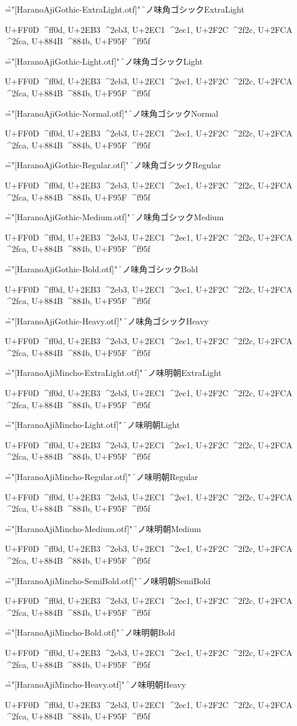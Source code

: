 
\nopagenumbers

\def\test{%
U+FF0D ^^^^ff0d,
U+2EB3 ^^^^2eb3,
U+2EC1 ^^^^2ec1,
U+2F2C ^^^^2f2c,
U+2FCA ^^^^2fca,
U+884B ^^^^884b,
U+F95F ^^^^f95f
}

\font\f="[HaranoAjiGothic-ExtraLight.otf]" \f
原ノ味角ゴシックExtraLight\par
\test

\font\f="[HaranoAjiGothic-Light.otf]" \f
原ノ味角ゴシックLight\par
\test

\font\f="[HaranoAjiGothic-Normal.otf]" \f
原ノ味角ゴシックNormal\par
\test

\font\f="[HaranoAjiGothic-Regular.otf]" \f
原ノ味角ゴシックRegular\par
\test

\font\f="[HaranoAjiGothic-Medium.otf]" \f
原ノ味角ゴシックMedium\par
\test

\font\f="[HaranoAjiGothic-Bold.otf]" \f
原ノ味角ゴシックBold\par
\test

\font\f="[HaranoAjiGothic-Heavy.otf]" \f
原ノ味角ゴシックHeavy\par
\test

\font\f="[HaranoAjiMincho-ExtraLight.otf]" \f
原ノ味明朝ExtraLight\par
\test

\font\f="[HaranoAjiMincho-Light.otf]" \f
原ノ味明朝Light\par
\test

\font\f="[HaranoAjiMincho-Regular.otf]" \f
原ノ味明朝Regular\par
\test

\font\f="[HaranoAjiMincho-Medium.otf]" \f
原ノ味明朝Medium\par
\test

\font\f="[HaranoAjiMincho-SemiBold.otf]" \f
原ノ味明朝SemiBold\par
\test

\font\f="[HaranoAjiMincho-Bold.otf]" \f
原ノ味明朝Bold\par
\test

\font\f="[HaranoAjiMincho-Heavy.otf]" \f
原ノ味明朝Heavy\par
\test

\bye
